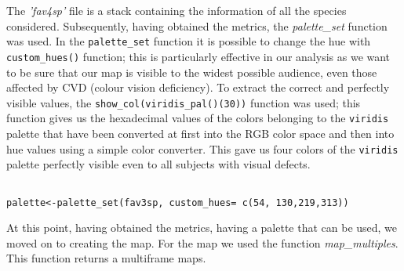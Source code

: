 \documentclass[12pt,a4paper]{article}
\begin{document}
\bigskip
The \textit{'fav4sp'} file is a stack containing the information of all the species considered.
Subsequently, having obtained the metrics, the  \textit{palette\_set} function was used.
In the \texttt{palette\_set} function it is possible to change the hue with \texttt{custom\_hues()} function; this is particularly effective in our analysis as we want to be sure that our map is visible to the widest possible audience, even those affected by CVD (colour vision deficiency).
To extract the correct and perfectly visible values, the \texttt{show\_col(viridis\_pal()(30))} function was used; this function gives us the hexadecimal values of the colors belonging to the \texttt{viridis} palette that have been converted at first into the RGB color space and then into hue values using a simple color converter. This gave us four colors of the \texttt{viridis} palette perfectly visible even to all subjects with visual defects.
\begin{lstlisting}

palette<-palette_set(fav3sp, custom_hues= c(54, 130,219,313))
\end{lstlisting}

\bigskip
At this point, having obtained the metrics, having a palette that can be used, we moved on to creating the map.
For the map we used the function \textit{map\_multiples}.
This function returns a multiframe maps.
\end{document}
